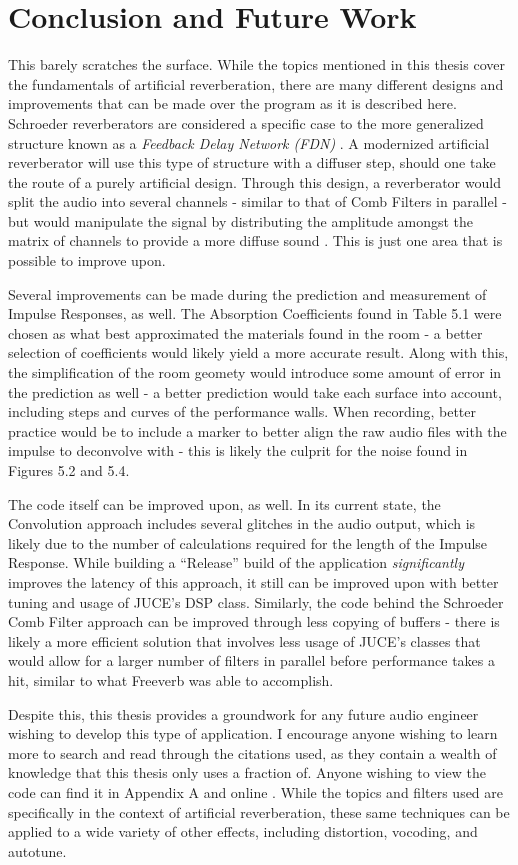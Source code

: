 \chapter{Conclusion and Future Work}
\hspace*{-0.15cm}This barely scratches the surface. While the topics mentioned in this thesis cover the fundamentals of artificial reverberation, there are many different designs and improvements that can be made over the program as it is described here. Schroeder reverberators are considered a specific case to the more generalized structure known as a \textit{Feedback Delay Network (FDN)} \cite{schlecht2016lossless}. A modernized artificial reverberator will use this type of structure with a diffuser step, should one take the route of a purely artificial design. Through this design, a reverberator would split the audio into several channels - similar to that of Comb Filters in parallel - but would manipulate the signal by distributing the amplitude amongst the matrix of channels to provide a more diffuse sound \cite{writeReverb}. This is just one area that is possible to improve upon.

Several improvements can be made during the prediction and measurement of Impulse Responses, as well. The Absorption Coefficients found in Table 5.1 were chosen as what best approximated the materials found in the room - a better selection of coefficients would likely yield a more accurate result. Along with this, the simplification of the room geomety would introduce some amount of error in the prediction as well - a better prediction would take each surface into account, including steps and curves of the performance walls. When recording, better practice would be to include a marker to better align the raw audio files with the impulse to deconvolve with - this is likely the culprit for the noise found in Figures 5.2 and 5.4.

The code itself can be improved upon, as well. In its current state, the Convolution approach includes several glitches in the audio output, which is likely due to the number of calculations required for the length of the Impulse Response. While building a ``Release'' build of the application \textit{significantly} improves the latency of this approach, it still can be improved upon with better tuning and usage of JUCE's DSP class. Similarly, the code behind the Schroeder Comb Filter approach can be improved through less copying of buffers - there is likely a more efficient solution that involves less usage of JUCE's classes that would allow for a larger number of filters in parallel before performance takes a hit, similar to what Freeverb was able to accomplish.

Despite this, this thesis provides a groundwork for any future audio engineer wishing to develop this type of application. I encourage anyone wishing to learn more to search and read through the citations used, as they contain a wealth of knowledge that this thesis only uses a fraction of. Anyone wishing to view the code can find it in Appendix A and online \cite{CODE}. While the topics and filters used are specifically in the context of artificial reverberation, these same techniques can be applied to a wide variety of other effects, including distortion, vocoding, and autotune.
